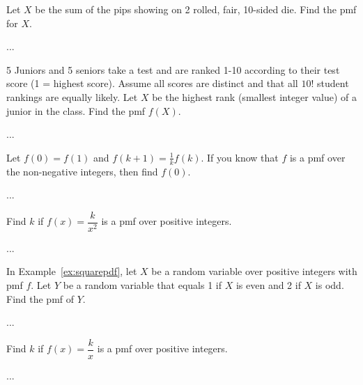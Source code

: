 \documentclass[../main.tex]{subfiles}
\begin{document}
\begin{example}
Let $X$ be the sum of the pips showing on 2 rolled, fair, 10-sided die.
Find the pmf for $X$.
\end{example}

\begin{solution}
...
\end{solution}

\begin{example}
5 Juniors and 5 seniors take a test and are ranked 1-10 according to their
test score (1 = highest score). Assume all scores are distinct and that all $10!$ student
rankings are equally likely. Let $X$ be the highest rank (smallest
integer value) of a junior in the class. Find the pmf $f(X)$.
\end{example}
\begin{solution}
...
\end{solution}
\begin{example}
Let $f(0) = f(1)$ and $f(k+1) = \frac{1}{k}f(k)$. If you know
that $f$ is a pmf over the non-negative integers, then find $f(0)$.
\end{example}
\begin{solution}
...
\end{solution}
\begin{example}
\label{ex:squarepdf}
Find $k$ if $f(x) = \dfrac{k}{x^2}$ is a pmf over positive integers.
\end{example}
\begin{solution}
...
\end{solution}
\begin{example}
In Example~\ref{ex:squarepdf}, let $X$ be a random variable over positive
integers with pmf $f$. Let $Y$ be a random variable that equals 1 if $X$ is
even and 2 if $X$ is odd. Find the pmf of $Y$.
\end{example}
\begin{solution}
...
\end{solution}
\begin{example}
Find $k$ if $f(x) = \dfrac{k}{x}$ is a pmf over positive integers.
\end{example}
\begin{solution}
...
\end{solution}
\end{document}
